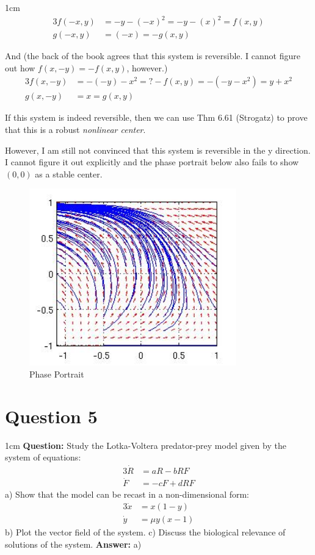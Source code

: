 \documentclass[12pt]{article}
\newenvironment{myenv}{\begin{adjustwidth}{1cm}{}}{\end{adjustwidth}}
\begin{document}
\begin{myenv}
\begin{alignat*}{3}
f(-x,y) &= -y-(-x)^2 = -y-(x)^2 = f(x,y) \\
g(-x,y) &= (-x) = -g(x,y)
\end{alignat*}

And (the back of the book agrees that this system is reversible. I cannot figure out how $f(x,-y) = -f(x,y)$, however.)
\begin{alignat*}{3}
f(x,-y) &= - (-y) - x^2 =? -f(x,y) = -(-y-x^2) = y+x^2 \\
g(x,-y) &= x = g(x,y)
\end{alignat*}

If this system is indeed reversible, then we can use Thm 6.61 (Strogatz) to prove that this is a robust \emph{nonlinear center}.

However, I am still not convinced that this system is reversible in the y direction. I cannot figure it out explicitly and the phase portrait below also fails to show $(0,0)$ as a stable center. 


\begin{figure} [H]
    \centering
    \includegraphics[width=0.8\textwidth]{Question4_Center}
    \caption{ Phase Portrait}
    \label{figure:a0}
\end{figure}
\end{myenv}

\section*{Question 5}
\begin{myenv}
\textbf{Question:} Study the Lotka-Voltera predator-prey model given by the system of equations:
\begin{alignat*}{3}
\dot{R} &= aR - bRF \\
\dot{F} &= -cF + dRF
\end{alignat*}
a) Show that the model can be recast in a non-dimensional form:
\begin{alignat*}{3}
\dot{x} &= x(1-y) \\
\dot{y} &= \mu y(x-1)
\end{alignat*}
b) Plot the vector field of the system.
c) Discuss the biological relevance of solutions of the system.
\textbf{Answer:} 
a) 


\end{myenv}
\end{document}

